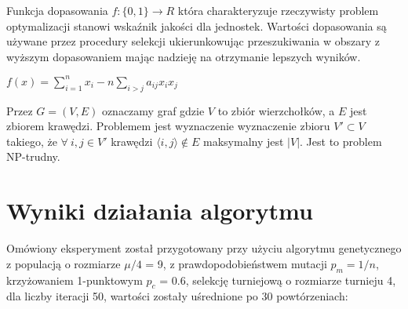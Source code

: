 \documentclass[11pt]{article}
\begin{document}
Funkcja dopasowania $ f: \{ 0,1 \} \to R $ która charakteryzuje 
rzeczywisty problem optymalizacji stanowi wskaźnik jakości dla 
jednostek. Wartości dopasowania są używane przez procedury 
selekcji ukierunkowując przeszukiwania w obszary z wyższym 
dopasowaniem mając nadzieję na otrzymanie lepszych wyników.
\begin{center}
$f(x) = \sum_{i=1}^n x_i - n \sum_{i>j} a_{ij} x_i x_j$
\end{center}
Przez $G=(V,E)$ oznaczamy graf gdzie $V$ to zbiór wierzchołków, a $E$ jest zbiorem 
krawędzi. Problemem jest wyznaczenie wyznaczenie zbioru $V' \subset V$ takiego, że
$\forall ~i,j \in V' $ krawędzi $\langle i,j \rangle \notin E $ maksymalny jest $|V|$. Jest to problem NP-trudny.

\newpage
\section{Wyniki działania algorytmu}

\noindent
Omówiony eksperyment został przygotowany przy użyciu algorytmu 
genetycznego z populacją o rozmiarze $ \mu/4$ = 9, z prawdopodobieństwem 
mutacji $p_m = 1/n$, krzyżowaniem 1-punktowym $p_c$ = 0.6, selekcję 
turniejową o rozmiarze turnieju 4, dla liczby iteracji 50, wartości 
zostały uśrednione po 30 powtórzeniach:\newline
\end{document}
